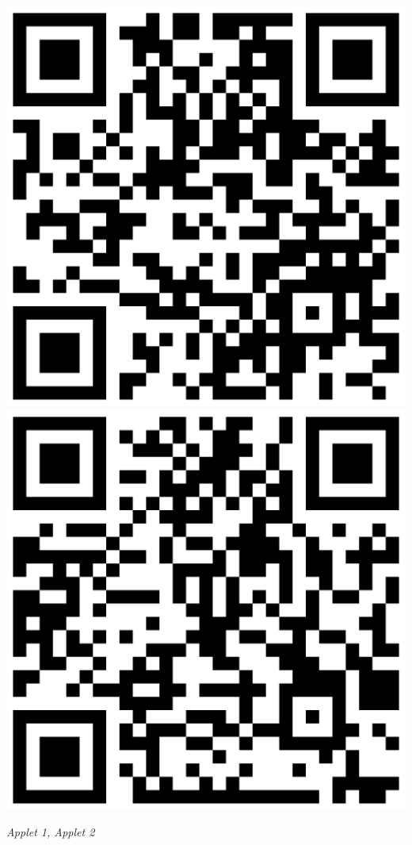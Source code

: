 \documentclass{article}
\begin{document}
\centering\includegraphics[scale=0.05]{applet1.png}
\includegraphics[scale=0.05]{applet2.png}

\centering\textit{Applet 1, Applet 2}

\listoffigures
\end{document}

